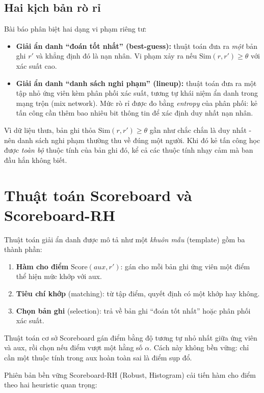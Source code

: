 \subsection{Hai kịch bản rò rỉ}
Bài báo phân biệt hai dạng vi phạm riêng tư:
\renewcommand{\labelitemi}{$-$}
\begin{itemize}
	\item \textbf{Giải ẩn danh ``đoán tốt nhất'' (best-guess):} thuật toán đưa ra \textit{một} bản ghi $r'$ và khẳng định đó là nạn nhân. Vi phạm xảy ra nếu $\mathrm{Sim}(r, r') \ge \theta$ với xác suất cao.
	\item \textbf{Giải ẩn danh ``danh sách nghi phạm'' (lineup):} thuật toán đưa ra một tập nhỏ ứng viên kèm phân phối xác suất, tương tự khái niệm ẩn danh trong mạng trộn (mix network). Mức rò rỉ được đo bằng \textit{entropy} của phân phối: kẻ tấn công cần thêm bao nhiêu bit thông tin để xác định duy nhất nạn nhân.
\end{itemize}
Vì dữ liệu thưa, bản ghi thỏa $\mathrm{Sim}(r, r') \ge \theta$ gần như chắc chắn là duy nhất - nên danh sách nghi phạm thường thu về đúng một người. Khi đó kẻ tấn công học được \textit{toàn bộ} thuộc tính của bản ghi đó, kể cả các thuộc tính nhạy cảm mà ban đầu hắn không biết.

\section{Thuật toán Scoreboard và Scoreboard-RH}

Thuật toán giải ẩn danh được mô tả như một \textit{khuôn mẫu} (template) gồm ba thành phần:
\begin{enumerate}[1.]
	\item \textbf{Hàm cho điểm} $\mathrm{Score}(aux, r')$: gán cho mỗi bản ghi ứng viên một điểm thể hiện mức khớp với aux.
	\item \textbf{Tiêu chí khớp} (matching): từ tập điểm, quyết định có một khớp hay không.
	\item \textbf{Chọn bản ghi} (selection): trả về bản ghi ``đoán tốt nhất'' hoặc phân phối xác suất.
\end{enumerate}

Thuật toán cơ sở Scoreboard gán điểm bằng độ tương tự nhỏ nhất giữa ứng viên và aux, rồi chọn nếu điểm vượt một hằng số $\alpha$. Cách này không bền vững: chỉ cần một thuộc tính trong aux hoàn toàn sai là điểm sụp đổ.

Phiên bản bền vững Scoreboard-RH (Robust, Histogram) cải tiến hàm cho điểm theo hai heuristic quan trọng:

